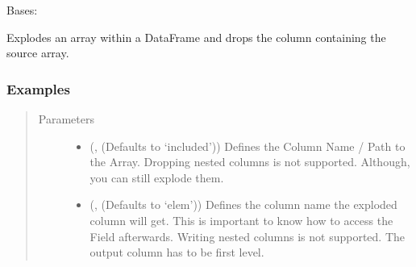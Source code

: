 \documentclass[a4paper,10pt, twoside,english]{sphinxmanual}
\begin{document}
\begin{fulllineitems}
\label{\detokenize{transformer/exploder:spooq2.transformer.exploder.Exploder}}
Bases: {\hyperref[\detokenize{base_classes/transformer:spooq2.transformer.transformer.Transformer}]{}}

Explodes an array within a DataFrame and
drops the column containing the source array.
\subsubsection*{Examples}

\begin{sphinxVerbatim}[commandchars=\\\{\}]
  
    
    
\end{sphinxVerbatim}
\begin{quote}\begin{description}
\item[{Parameters}] \leavevmode\begin{itemize}
\item {} 
 (, (Defaults to ‘included’)) \textendash{} Defines the Column Name / Path to the Array.
Dropping nested columns is not supported.
Although, you can still explode them.

\item {} 
 (, (Defaults to ‘elem’)) \textendash{} Defines the column name the exploded column will get.
This is important to know how to access the Field afterwards.
Writing nested columns is not supported.
The output column has to be first level.


\end{itemize}
\end{description}
\end{quote}
\end{fulllineitems}
\end{document}
